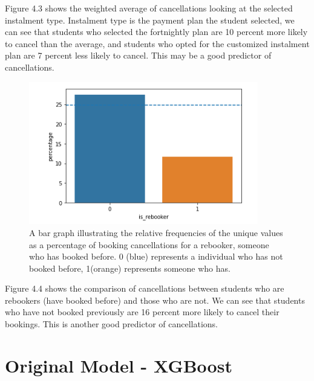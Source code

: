   
 Figure 4.3 shows the weighted average of cancellations looking at the selected instalment type. Instalment type is the payment plan the student selected, we can see that students who selected the fortnightly plan are 10 percent more likely to cancel than the average, and students who opted for the customized instalment plan are 7 percent less likely to cancel. This may be a good predictor of cancellations.
  
  
   \begin{figure}[H]
 \centering
\includegraphics[width=10cm]{figures/is_rebooker.png}
 \caption{A bar graph illustrating the relative frequencies of the unique values as a percentage of booking cancellations for a rebooker, someone who has booked before. 0 (blue) represents a individual who has not booked before, 1(orange) represents someone who has.}
\end{figure}
  
Figure 4.4 shows the comparison of cancellations between students who are rebookers (have booked before) and those who are not. We can see that students who have not booked previously are 16 percent more likely to cancel their bookings. This is another good predictor of cancellations.  
 
 \section{Original Model - XGBoost}

